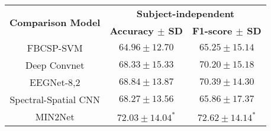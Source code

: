     \begin{tabular}{@{}ccc@{}}
    \toprule
    \multirow{2}{*}{\textbf{Comparison Model}} & \multicolumn{2}{c}{\textbf{Subject-independent}}       \\ \cmidrule(l){2-3} 
                                               & \textbf{Accuracy $\pm$ SD}          & \textbf{F1-score $\pm$ SD}         \\ \midrule
    FBCSP-SVM                                  & $64.96 \pm 12.70$          & $65.25 \pm 15.14$         \\
    Deep Convnet                               & $68.33 \pm 15.33$          & $70.20 \pm 15.18$         \\
    EEGNet-8,2                                 & $68.84 \pm 13.87$          & $70.39 \pm 14.30$         \\
    Spectral-Spatial CNN                       & $68.27 \pm 13.56$          & $65.86 \pm 17.37$         \\
    MIN2Net                                    & $\mathbf{72.03 \pm 14.04^*}$ & $\mathbf{72.62 \pm 14.14^*}$ \\ \bottomrule
    \end{tabular}%